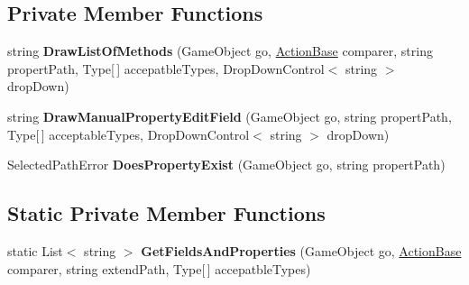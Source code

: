\subsection*{Private Member Functions}
\begin{DoxyCompactItemize}
\item 
\mbox{\label{class_unity_test_1_1_property_path_selector_a08abe8fd3d1b0ef59c76892396e1fc12}} 
string {\bfseries Draw\+List\+Of\+Methods} (Game\+Object go, \hyperlink{class_unity_test_1_1_action_base}{Action\+Base} comparer, string propert\+Path, Type\mbox{[}$\,$\mbox{]} accepatble\+Types, Drop\+Down\+Control$<$ string $>$ drop\+Down)
\item 
\mbox{\label{class_unity_test_1_1_property_path_selector_a670564c300b80a730d9f60bbee27ac02}} 
string {\bfseries Draw\+Manual\+Property\+Edit\+Field} (Game\+Object go, string propert\+Path, Type\mbox{[}$\,$\mbox{]} acceptable\+Types, Drop\+Down\+Control$<$ string $>$ drop\+Down)
\item 
\mbox{\label{class_unity_test_1_1_property_path_selector_aba6d337d1add257846b1c34cfdade813}} 
Selected\+Path\+Error {\bfseries Does\+Property\+Exist} (Game\+Object go, string propert\+Path)
\end{DoxyCompactItemize}
\subsection*{Static Private Member Functions}
\begin{DoxyCompactItemize}
\item 
\mbox{\label{class_unity_test_1_1_property_path_selector_a91d72c0895d3a6324b98456b08b50dc8}} 
static List$<$ string $>$ {\bfseries Get\+Fields\+And\+Properties} (Game\+Object go, \hyperlink{class_unity_test_1_1_action_base}{Action\+Base} comparer, string extend\+Path, Type\mbox{[}$\,$\mbox{]} accepatble\+Types)
\end{DoxyCompactItemize}
